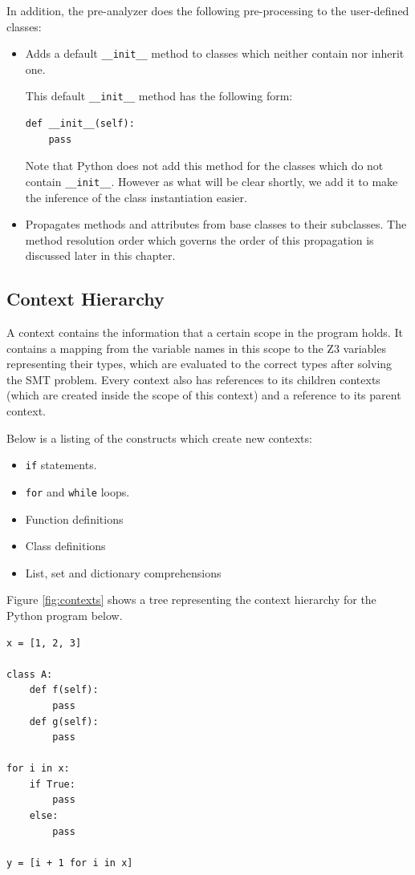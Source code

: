 In addition, the pre-analyzer does the following pre-processing to the user-defined classes:
\begin{itemize}
	\item Adds a default \lstinline|__init__| method to classes which neither contain nor inherit one.
	
	This default \lstinline|__init__| method has the following form:
	\begin{lstlisting}
def __init__(self):
	pass
	\end{lstlisting}
	Note that Python does not add this method for the classes which do not contain \lstinline|__init__|. However as what will be clear shortly, we add it to make the inference of the class instantiation easier.
	\item Propagates methods and attributes from base classes to their subclasses. The method resolution order which governs the order of this propagation is discussed later in this chapter.
\end{itemize}

\subsection{Context Hierarchy}
A context contains the information that a certain scope in the program holds. It contains a mapping from the variable names in this scope to the Z3 variables representing their types, which are evaluated to the correct types after solving the SMT problem. Every context also has references to its children contexts (which are created inside the scope of this context) and a reference to its parent context.

Below is a listing of the constructs which create new contexts:

\begin{itemize}
	\item \lstinline|if| statements.
	\item \lstinline|for| and \lstinline|while| loops.
	\item Function definitions
	\item Class definitions
	\item List, set and dictionary comprehensions
\end{itemize}

Figure \ref{fig:contexts} shows a tree representing the context hierarchy for the Python program below.

\begin{lstlisting}
x = [1, 2, 3]

class A:
	def f(self):
		pass
	def g(self):
		pass
	
for i in x:
	if True:
		pass
	else:
		pass
		
y = [i + 1 for i in x]
\end{lstlisting}

